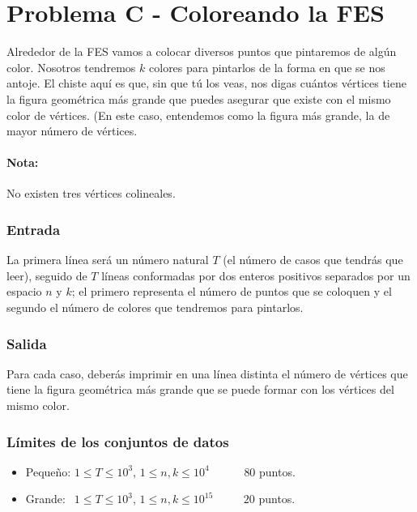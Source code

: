 \chapter*{Problema C - Coloreando la FES}

Alrededor de la FES vamos a colocar diversos puntos
que pintaremos de algún color. Nosotros tendremos $k$
colores para pintarlos de la forma en que se nos antoje.
El chiste aquí es que, sin que tú los veas, nos digas 
cuántos vértices tiene la figura geométrica más grande 
que puedes asegurar que existe con el mismo color de 
vértices. (En este caso, entendemos como la figura más 
grande, la de mayor número de vértices.



\subsubsection*{Nota:}
No existen tres vértices colineales.



\subsection*{Entrada}
La primera línea será un número natural $T$ (el número 
de casos que tendrás que leer), seguido de $T$ líneas
conformadas por dos enteros positivos separados por un
espacio $n$ y $k$; el primero representa el número de
puntos que se coloquen y el segundo el número de colores
que tendremos para pintarlos.



\subsection*{Salida}
Para cada caso, deberás imprimir en una línea distinta 
el número de vértices que tiene la figura geométrica más
grande que se puede formar con los vértices del mismo 
color.



\subsection*{Límites de los conjuntos de datos}

\begin{itemize}
    \item Pequeño: $ 1 \leq T \leq 10^3 $, $ 1 \leq n,
    k \leq 10^4$   $\quad \;\;\;\;\;$ $80$ puntos.
    \item Grande: $ \;\, 1 \leq T \leq 10^3 $, $ 1 
    \leq n, k \leq 10^{15} $ $\quad \quad$ $20$ puntos.
\end{itemize}



